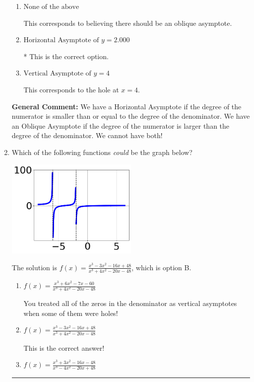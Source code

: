 \documentclass{extbook}[14pt]
\newcommand{\litem}[1]{\item #1

\rule{\textwidth}{0.4pt}}
\begin{document}
\begin{enumerate}
{\begin{enumerate}[label=\Alph*.]
This corresponds to the hole at $x = -4.000$.
\item \( \text{None of the above} \)

This corresponds to believing there should be an oblique asymptote.
\item \( \text{Horizontal Asymptote of } y = 2.000  \)

* This is the correct option.
\item \( \text{Vertical Asymptote of } y = 4  \)

This corresponds to the hole at $x = 4$.
\end{enumerate}

\textbf{General Comment:} We have a Horizontal Asymptote if the degree of the numerator is smaller than or equal to the degree of the denominator. We have an Oblique Asymptote if the degree of the numerator is larger than the degree of the denominator. We cannot have both!
}
\litem{
Which of the following functions \textit{could} be the graph below?

\begin{center}
    \includegraphics[width=0.5\textwidth]{../Figures/identifyGraphOfRationalFunctionC.png}
\end{center}




The solution is \( f(x)=\frac{x^{3} -3 x^{2} -16 x + 48}{x^{3} +4 x^{2} -20 x -48} \), which is option B.\begin{enumerate}[label=\Alph*.]
\item \( f(x)=\frac{x^{3} +6 x^{2} -7 x -60}{x^{3} +4 x^{2} -20 x -48} \)

You treated all of the zeros in the denominator as vertical asymptotes when some of them were holes!
\item \( f(x)=\frac{x^{3} -3 x^{2} -16 x + 48}{x^{3} +4 x^{2} -20 x -48} \)

This is the correct answer!
\item \( f(x)=\frac{x^{3} +3 x^{2} -16 x -48}{x^{3} -4 x^{2} -20 x + 48} \)


\end{enumerate}}
\end{enumerate}
\end{document}
